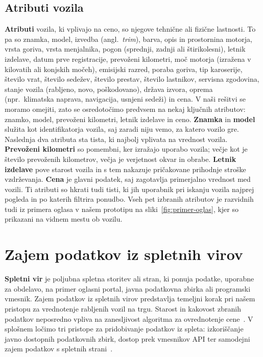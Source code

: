 \documentclass[a4paper,12pt,openright]{book}
\begin{document}
\subsection{Atributi vozila}
\label{subsec:atributi}
\textbf{Atributi} vozila, ki vplivajo na ceno, so njegove tehnične ali fizične lastnosti.
To pa so znamka, model, izvedba (angl.\ \emph{trim}), barva, opis in prostornina motorja, vrsta goriva, vrsta menjalnika,
 pogon (sprednji, zadnji ali štirikolesni), letnik izdelave, datum prve registracije, prevoženi kilometri,
 moč motorja (izražena v kilovatih ali konjskih močeh), emisijski razred, poraba goriva, tip karoserije,
 število vrat, število sedežev, število prestav, število lastnikov, servisna zgodovina, stanje vozila (rabljeno, novo, poškodovano),
 država izvora, oprema (npr.\ klimatska naprava, navigacija, usnjeni sedeži) in cena.
  V naši rešitvi se moramo omejiti, zato se osredotočimo predvsem na nekaj 
  ključnih atributov: znamko, model, prevoženi kilometri, letnik izdelave in ceno.
\textbf{Znamka} in \textbf{model} služita kot identifikatorja vozila, saj zaradi niju vemo, za katero vozilo gre.
 Naslednja dva atributa sta tista, ki najbolj vplivata na vrednost vozila.
 \textbf{Prevoženi kilometri} so pomembni, ker izražajo uporabo vozila; večje kot je število prevoženih kilometrov, večja je verjetnost okvar in obrabe. 
 \textbf{Letnik izdelave} pove starost vozila in s tem nakazuje pričakovane prihodnje stroške vzdrževanja. 
 \textbf{Cena} je glavni podatek, saj zagotavlja primerjalno vrednost med vozili.
 Ti atributi so hkrati tudi tisti, ki jih uporabnik pri iskanju vozila najprej pogleda in po katerih filtrira ponudbo.
 Vseh pet izbranih atributov je razvidnih tudi iz primera oglasa v našem prototipu na sliki~\ref{fig:primer-oglas}, kjer so prikazani na vidnem mestu ob vozilu.

\section{Zajem podatkov iz spletnih virov}
\label{sec:zajem-podatkov}
\textbf{Spletni vir} je poljubna spletna storitev ali stran, ki ponuja podatke, uporabne za obdelavo,
 na primer oglasni portal, javna podatkovna zbirka ali programski vmesnik.
Zajem podatkov iz spletnih virov predstavlja temeljni korak pri našem pristopu za vrednotenje rabljenih vozil na trgu.
Starost in kakovost zbranih podatkov neposredno
vpliva na zanesljivost algoritma za ovrednotenje cene~\cite{laender2002}. V splošnem ločimo tri
pristope za pridobivanje podatkov iz spleta: izkoriščanje javno dostopnih
podatkovnih zbirk, dostop prek vmesnikov API ter samodejni zajem podatkov s spletnih strani~\cite{laender2002}.
\end{document}
